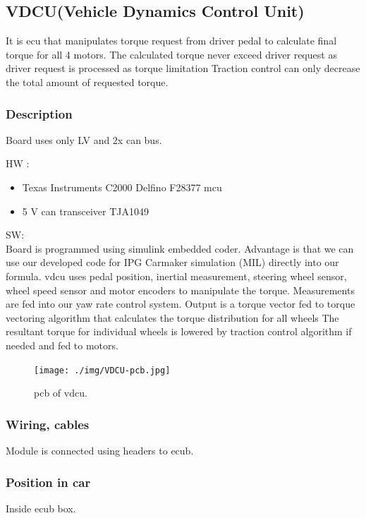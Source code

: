 \subsection{VDCU(Vehicle Dynamics Control Unit)}
It is \gls{ecu} that manipulates torque request from driver pedal to calculate final torque for all 4 motors. The calculated torque never exceed driver request as driver request is processed as torque limitation Traction control can only decrease the total amount of requested torque.

\subsubsection{Description}
Board uses only LV and 2x \gls{can} bus.

HW :
\begin{itemize}
	\item Texas Instruments C2000 Delfino F28377 \gls{mcu}
	\item 5 V can transceiver TJA1049
\end{itemize}

\noindent SW:\\
Board is programmed using simulink embedded coder. Advantage is that we can use our developed code for IPG Carmaker simulation (MIL) directly into our formula. \gls{vdcu} uses pedal position, inertial measurement, steering wheel sensor, wheel speed sensor and motor encoders to manipulate the torque. Measurements are fed into our yaw rate control system. Output is a torque vector fed to torque vectoring algorithm that calculates the torque distribution for all wheels The resultant torque for individual wheels is lowered by traction control algorithm if needed and fed to motors.

\begin{figure}[H]
	\centering
	\texttt{[image: ./img/VDCU-pcb.jpg]}
	\caption{\gls{pcb} of \gls{vdcu}.}
	\label{fig:VDCU-pcb}
\end{figure}

\subsubsection{Wiring, cables}
Module is connected using headers to \gls{ecub}.

\subsubsection{Position in car}
Inside \gls{ecub} box.

